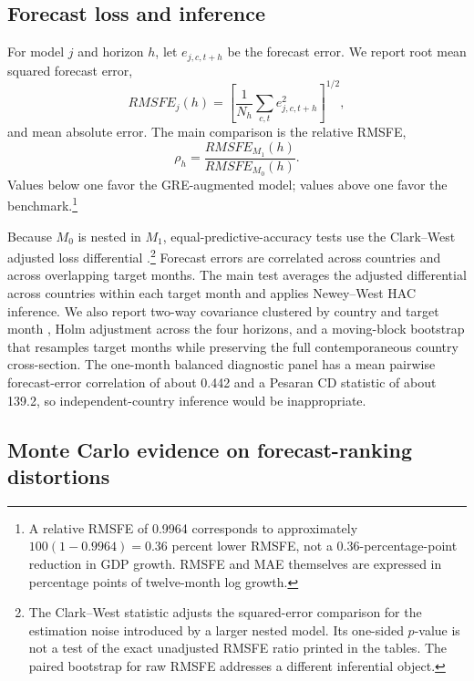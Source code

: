 \documentclass[preprint,12pt,authoryear]{elsarticle}
\begin{document}
\subsection{Forecast loss and inference}

For model $j$ and horizon $h$, let $e_{j,c,t+h}$ be the forecast error. We report root mean squared forecast error,
\begin{equation}
RMSFE_j(h)=\left[\frac{1}{N_h}\sum_{c,t} e_{j,c,t+h}^2\right]^{1/2},
\end{equation}
and mean absolute error. The main comparison is the relative RMSFE,
\begin{equation}
\rho_h=\frac{RMSFE_{M_1}(h)}{RMSFE_{M_0}(h)}.
\label{eq:relative_rmsfe}
\end{equation}
Values below one favor the GRE-augmented model; values above one favor the benchmark.\footnote{A relative RMSFE of 0.9964 corresponds to approximately $100(1-0.9964)=0.36$ percent lower RMSFE, not a 0.36-percentage-point reduction in GDP growth. RMSFE and MAE themselves are expressed in percentage points of twelve-month log growth.}

Because $M_0$ is nested in $M_1$, equal-predictive-accuracy tests use the Clark--West adjusted loss differential \citep{clarkwest2007}.\footnote{The Clark--West statistic adjusts the squared-error comparison for the estimation noise introduced by a larger nested model. Its one-sided $p$-value is not a test of the exact unadjusted RMSFE ratio printed in the tables. The paired bootstrap for raw RMSFE addresses a different inferential object.} Forecast errors are correlated across countries and across overlapping target months. The main test averages the adjusted differential across countries within each target month and applies Newey--West HAC inference. We also report two-way covariance clustered by country and target month \citep{qu2024,akgun2024,coroneo2025}, Holm adjustment across the four horizons, and a moving-block bootstrap that resamples target months while preserving the full contemporaneous country cross-section. The one-month balanced diagnostic panel has a mean pairwise forecast-error correlation of about 0.442 and a Pesaran CD statistic of about 139.2, so independent-country inference would be inappropriate.

\subsection{Monte Carlo evidence on forecast-ranking distortions}
\end{document}
